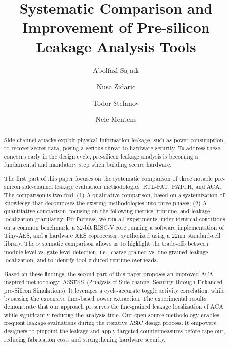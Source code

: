 \documentclass[sigconf]{acmart}
\newcommand{\methodname}{ASSESS}
\newcommand{\methoddis}{Analysis of Side-channel Security through Enhanced pre-Silicon Simulations}
\begin{document}
\title{Systematic Comparison and Improvement of Pre-silicon Leakage Analysis Tools}
\author{Abolfazl Sajadi}

\author{Nusa Zidaric}

\author{Todor Stefanov}

\author{Nele Mentens}
\begin{abstract}

{Side-channel attacks exploit physical information leakage, such as power consumption, to recover secret data, posing a serious threat to hardware security. To address these concerns early in the design cycle, pre-silicon leakage analysis is becoming a fundamental and mandatory step when building secure hardware. 

The first part of this paper focuses on the systematic comparison of three notable pre-silicon side-channel leakage evaluation methodologies: RTL-PAT, PATCH, and ACA. The comparison is two-fold: (1) A qualitative comparison, based on a systemization of knowledge that decomposes the existing methodologies into three phases; (2) A quantitative comparison, focusing on the following metrics: runtime, and leakage localization granularity. For fairness, we run all experiments under identical conditions on a common benchmark: a 32-bit RISC-V core %
running a software implementation of Tiny-AES, %
and a hardware AES coprocessor, synthesized using a 22nm standard-cell library. The systematic comparison allows us to highlight the trade-offs between module-level vs. gate-level detection, i.e., coarse-grained vs. fine-grained leakage localization, and to identify tool-induced runtime overheads.
 
Based on these findings, the second part of this paper proposes an improved ACA-inspired methodology: \methodname\ (\methoddis). It leverages a cycle-accurate toggle activity correlation, while bypassing the expensive time-based power extraction. The experimental results demonstrate that our approach preserves the fine-grained leakage localization of ACA while significantly reducing the analysis time. %
Our open-source methodology enables frequent leakage evaluations during the iterative ASIC design process. It empowers designers to pinpoint the leakage and apply targeted countermeasures before tape-out, reducing fabrication costs and strengthening hardware security.}
\end{abstract}
\end{document}
